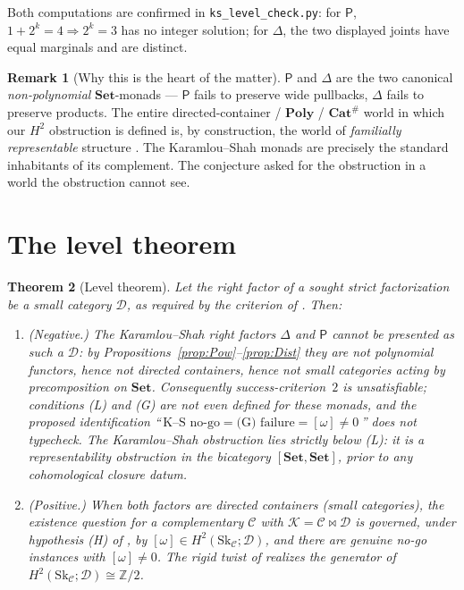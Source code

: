 \documentclass[11pt]{article}
\newtheorem{theorem}{Theorem}
\theoremstyle{definition}
\newtheorem{remark}[theorem]{Remark}
\newcommand{\C}{\mathcal{C}}
\newcommand{\D}{\mathcal{D}}
\newcommand{\K}{\mathcal{K}}
\newcommand{\Set}{\mathbf{Set}}
\newcommand{\Poly}{\mathbf{Poly}}
\newcommand{\Sk}{\mathrm{Sk}}
\newcommand{\Pow}{\mathsf{P}}
\newcommand{\Dist}{\Delta}
\begin{document}
Both computations are confirmed in \texttt{ks\_level\_check.py}: for $\Pow$,
$1+2^k=4\Rightarrow 2^k=3$ has no integer solution; for $\Dist$, the two displayed
joints have equal marginals and are distinct.

\begin{remark}[Why this is the heart of the matter]
$\Pow$ and $\Dist$ are the two canonical \emph{non-polynomial} $\Set$-monads ---
$\Pow$ fails to preserve wide pullbacks, $\Dist$ fails to preserve products. The
entire directed-container / $\Poly$ / $\mathbf{Cat}^{\#}$ world in which our
$H^2$ obstruction is defined is, by construction, the world of \emph{familially
representable} structure \cite{shapirospivak}. The Karamlou--Shah monads are
precisely the standard inhabitants of its complement. The conjecture asked for the
obstruction in a world the obstruction cannot see.
\end{remark}

\section{The level theorem}

\begin{theorem}[Level theorem]\label{thm:level}
Let the right factor of a sought strict factorization be a small category $\D$, as
required by the criterion of \cite{pairwise,Gcohom}. Then:
\begin{enumerate}
\item \textnormal{(Negative.)} The Karamlou--Shah right factors $\Dist$ and $\Pow$
cannot be presented as such a $\D$: by Propositions~\ref{prop:Pow}--\ref{prop:Dist}
they are not polynomial functors, hence not directed containers, hence not small
categories acting by precomposition on $\Set$. Consequently success-criterion~$2$
is unsatisfiable; conditions \textnormal{(L)} and \textnormal{(G)} are not even
\emph{defined} for these monads, and the proposed identification
``\,$\text{K--S no-go}=\text{(G) failure}=[\omega]\neq0$\,'' does not typecheck. The
Karamlou--Shah obstruction lies strictly \emph{below} \textnormal{(L)}: it is a
\emph{representability} obstruction in the bicategory $[\Set,\Set]$, prior to any
cohomological closure datum.
\item \textnormal{(Positive.)} When both factors \emph{are} directed containers
(small categories), the existence question for a complementary $\C$ with
$\K=\C\bowtie\D$ is governed, under hypothesis \textnormal{(H)} of \cite{Gcohom}, by
$[\omega]\in H^2(\Sk_\C;\D)$, and there are genuine \emph{no-go} instances with
$[\omega]\neq0$. The rigid twist of \cite[Ex.~5.1]{Gcohom} realizes the generator of
$H^2(\Sk_\C;\D)\cong\mathbb Z/2$.
\end{enumerate}
\end{theorem}
\end{document}
